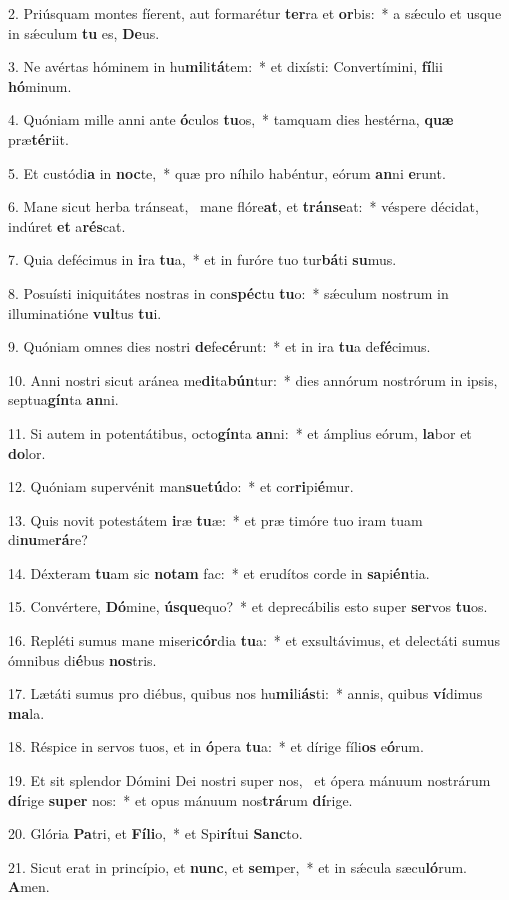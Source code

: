 2. Priúsquam montes fíerent, aut formarétur \textbf{ter}ra et \textbf{or}bis:~*  a sǽculo et usque in sǽculum \textbf{tu} es, \textbf{De}us.\

3. Ne avértas hóminem in hu\textbf{mi}li\textbf{tá}tem:~*  et dixísti: Convertímini, \textbf{fí}lii \textbf{hó}minum.\

4. Quóniam mille anni ante \textbf{ó}culos \textbf{tu}os,~*  tamquam dies hestérna, \textbf{quæ} præ\textbf{tér}iit.\

5. Et custódi\textbf{a} in \textbf{noc}te,~*  quæ pro níhilo habéntur, eórum \textbf{an}ni \textbf{e}runt.\

6. Mane sicut herba tránseat, \dag\  mane flóre\textbf{at}, et \textbf{tráns}\textbf{e}at:~*  véspere décidat, indúret \textbf{et} a\textbf{rés}cat.\

7. Quia defécimus in \textbf{i}ra \textbf{tu}a,~*  et in furóre tuo tur\textbf{bá}ti \textbf{su}mus.\

8. Posuísti iniquitátes nostras in con\textbf{spéc}tu \textbf{tu}o:~*  sǽculum nostrum in illuminatióne \textbf{vul}tus \textbf{tu}i.\

9. Quóniam omnes dies nostri \textbf{de}fe\textbf{cé}runt:~*  et in ira \textbf{tu}a de\textbf{fé}cimus.\

10. Anni nostri sicut aránea me\textbf{di}ta\textbf{bún}tur:~*  dies annórum nostrórum in ipsis, septua\textbf{gín}ta \textbf{an}ni.\

11. Si autem in potentátibus, octo\textbf{gín}ta \textbf{an}ni:~*  et ámplius eórum, \textbf{la}bor et \textbf{do}lor.\

12. Quóniam supervénit man\textbf{su}e\textbf{tú}do:~*  et cor\textbf{ri}pi\textbf{é}mur.\

13. Quis novit potestátem \textbf{i}ræ \textbf{tu}æ:~*  et præ timóre tuo iram tuam di\textbf{nu}me\textbf{rá}re?\

14. Déxteram \textbf{tu}am sic \textbf{no}\textbf{tam} fac:~*  et erudítos corde in \textbf{sa}pi\textbf{én}tia.\

15. Convértere, \textbf{Dó}mine, \textbf{ús}\textbf{que}quo?~*  et deprecábilis esto super \textbf{ser}vos \textbf{tu}os.\

16. Repléti sumus mane miseri\textbf{cór}dia \textbf{tu}a:~*  et exsultávimus, et delectáti sumus ómnibus di\textbf{é}bus \textbf{nos}tris.\

17. Lætáti sumus pro diébus, quibus nos hu\textbf{mi}li\textbf{ás}ti:~*  annis, quibus \textbf{ví}dimus \textbf{ma}la.\

18. Réspice in servos tuos, et in \textbf{ó}pera \textbf{tu}a:~*  et dírige fíli\textbf{os} e\textbf{ó}rum.\

19. Et sit splendor Dómini Dei nostri super nos, \dag\  et ópera mánuum nostrárum \textbf{dí}rige \textbf{su}\textbf{per} nos:~*  et opus mánuum nos\textbf{trá}rum \textbf{dí}rige.\

20. Glória \textbf{Pa}tri, et \textbf{Fí}\textbf{li}o,~*  et Spi\textbf{rí}tui \textbf{Sanc}to.\

21. Sicut erat in princípio, et \textbf{nunc}, et \textbf{sem}per,~*  et in sǽcula sæcu\textbf{ló}rum. \textbf{A}men.\

